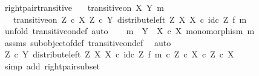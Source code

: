 \begin{isabellebody}
\isanewline
{}\isamarkupfalse%
%
\endisatagproof
{\isafoldproof}%
%
\isadelimproof
\isanewline
%
\endisadelimproof
\isanewline
{}\isamarkupfalse%
\ right{\isacharunderscore}{\kern0pt}pair{\isacharunderscore}{\kern0pt}transitive{\isacharcolon}{\kern0pt}\isanewline
\ \ \ {\isachardoublequoteopen}transitive{\isacharunderscore}{\kern0pt}on\ X\ {\isacharparenleft}{\kern0pt}Y{\isacharcomma}{\kern0pt}\ m{\isacharparenright}{\kern0pt}{\isachardoublequoteclose}\isanewline
\ \ \ {\isachardoublequoteopen}transitive{\isacharunderscore}{\kern0pt}on\ {\isacharparenleft}{\kern0pt}Z\ {\isasymtimes}\isactrlsub c\ X{\isacharparenright}{\kern0pt}\ {\isacharparenleft}{\kern0pt}Z\ {\isasymtimes}\isactrlsub c\ Y{\isacharcomma}{\kern0pt}\ distribute{\isacharunderscore}{\kern0pt}left\ Z\ X\ X\ {\isasymcirc}\isactrlsub c\ {\isacharparenleft}{\kern0pt}id\isactrlsub c\ Z\ {\isasymtimes}\isactrlsub f\ m{\isacharparenright}{\kern0pt}{\isacharparenright}{\kern0pt}{\isachardoublequoteclose}\isanewline
%
\isadelimproof
%
\endisadelimproof
%
\isatagproof
{}\isamarkupfalse%
\ {\isacharparenleft}{\kern0pt}unfold\ transitive{\isacharunderscore}{\kern0pt}on{\isacharunderscore}{\kern0pt}def{\isacharcomma}{\kern0pt}\ auto{\isacharparenright}{\kern0pt}\isanewline
\ \ \isamarkupfalse%
\ {\isachardoublequoteopen}m\ {\isacharcolon}{\kern0pt}\ Y\ {\isasymrightarrow}\ X\ {\isasymtimes}\isactrlsub c\ X{\isachardoublequoteclose}\ {\isachardoublequoteopen}monomorphism\ m{\isachardoublequoteclose}\isanewline
\ \ \ \ \isamarkupfalse%
\ assms\ subobject{\isacharunderscore}{\kern0pt}of{\isacharunderscore}{\kern0pt}def{}\ transitive{\isacharunderscore}{\kern0pt}on{\isacharunderscore}{\kern0pt}def\ \isamarkupfalse%
\ auto\isanewline
\ \ \isamarkupfalse%
\ \isamarkupfalse%
\ {\isachardoublequoteopen}{\isacharparenleft}{\kern0pt}Z\ {\isasymtimes}\isactrlsub c\ Y{\isacharcomma}{\kern0pt}\ distribute{\isacharunderscore}{\kern0pt}left\ Z\ X\ X\ {\isasymcirc}\isactrlsub c\ id\isactrlsub c\ Z\ {\isasymtimes}\isactrlsub f\ m{\isacharparenright}{\kern0pt}\ {\isasymsubseteq}\isactrlsub c\ {\isacharparenleft}{\kern0pt}Z\ {\isasymtimes}\isactrlsub c\ X{\isacharparenright}{\kern0pt}\ {\isasymtimes}\isactrlsub c\ Z\ {\isasymtimes}\isactrlsub c\ X{\isachardoublequoteclose}\isanewline
\ \ \ \ \isamarkupfalse%
\ {\isacharparenleft}{\kern0pt}simp\ add{\isacharcolon}{\kern0pt}\ right{\isacharunderscore}{\kern0pt}pair{\isacharunderscore}{\kern0pt}subset{\isacharparenright}{\kern0pt}\isanewline

\end{isabellebody}

